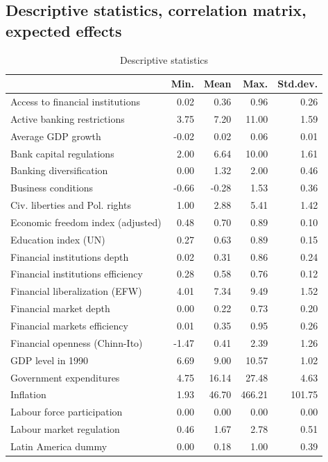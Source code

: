 \documentclass[a4paper,11pt]{article}
\begin{document}
\subsection*{Descriptive statistics, correlation matrix, expected effects}
\begin{table}[!ht]
\caption{Descriptive statistics}
\label{tab:desc_stat}
\centering
\begin{tabular}{lrrrr}
  \toprule
	 & Min. & Mean & Max. & Std.dev. \\ 
  \midrule
  Access to financial institutions & 0.02 & 0.36 & 0.96 & 0.26 \\ 
  Active banking restrictions & 3.75 & 7.20 & 11.00 & 1.59 \\ 
  Average GDP growth & -0.02 & 0.02 & 0.06 & 0.01 \\ 
  Bank capital regulations & 2.00 & 6.64 & 10.00 & 1.61 \\ 
  Banking diversification & 0.00 & 1.32 & 2.00 & 0.46 \\ 
  Business conditions & -0.66 & -0.28 & 1.53 & 0.36 \\ 
  Civ. liberties and Pol. rights & 1.00 & 2.88 & 5.41 & 1.42 \\ 
  Economic freedom index (adjusted) & 0.48 & 0.70 & 0.89 & 0.10 \\ 
  Education index (UN) & 0.27 & 0.63 & 0.89 & 0.15 \\ 
  Financial institutions depth & 0.02 & 0.31 & 0.86 & 0.24 \\ 
  Financial institutions efficiency & 0.28 & 0.58 & 0.76 & 0.12 \\ 
  Financial liberalization (EFW) & 4.01 & 7.34 & 9.49 & 1.52 \\ 
  Financial market depth & 0.00 & 0.22 & 0.73 & 0.20 \\ 
  Financial markets efficiency & 0.01 & 0.35 & 0.95 & 0.26 \\ 
  Financial openness (Chinn-Ito) & -1.47 & 0.41 & 2.39 & 1.26 \\ 
  GDP level in 1990 & 6.69 & 9.00 & 10.57 & 1.02 \\ 
  Government expenditures & 4.75 & 16.14 & 27.48 & 4.63 \\ 
  Inflation & 1.93 & 46.70 & 466.21 & 101.75 \\ 
  Labour force participation & 0.00 & 0.00 & 0.00 & 0.00 \\ 
  Labour market regulation & 0.46 & 1.67 & 2.78 & 0.51 \\ 
  Latin America dummy & 0.00 & 0.18 & 1.00 & 0.39 \\ 

\end{tabular}
\end{table}
\end{document}
